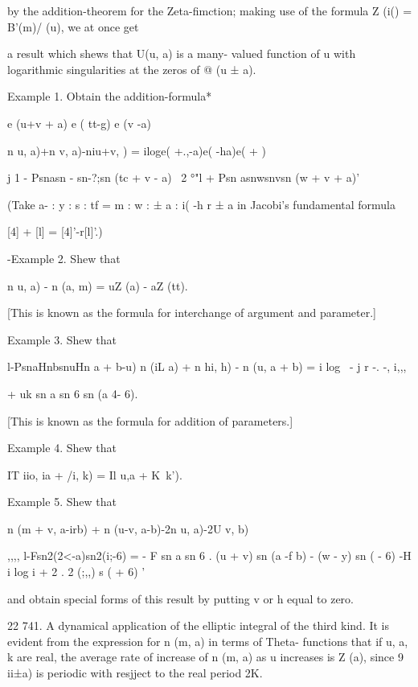 %
%

by the addition-theorem for the Zeta-fimction; making use of the
formula Z (i() = B'(m)/ (u), we at once get

a result which shews that U(u, a) is a many- valued function of u with
logarithmic singularities at the zeros of @ (u ± a).

Example 1. Obtain the addition-formula*

e (u+v + a) e ( tt-g) e (v -a)

n u, a)+n v, a)-niu+v, ) = iloge( +.,-a)e( -ha)e( + )

j 1 - Psnasn - sn-?;sn (tc + v - a) ~2 °"l + Psn asnwsnvsn (w + v +
a)'


(Take a- : y : s : tf = m : w : ± a : i( -h r ± a in Jacobi's
fundamental formula

[4] + [l] = [4]'-r[l]'.)

-Example 2. Shew that

n u, a) - n (a, m) = uZ (a) - aZ (tt).


[This is known as the formula for interchange of argument and
parameter.]

Example 3. Shew that

l-PsnaHnbsnuHn a + b-u) n (iL a) + n hi, h) - n (u, a + b) = i log \,
- j r -. -, i,,,\

+ uk sn a sn 6 sn (a 4- 6).

 [This is known as the formula for addition of parameters.]

Example 4. Shew that

IT iio, ia + /i, k) = Il u,a + K\ k'). 

Example 5. Shew that

n (m + v, a-irb) + n (u-v, a-b)-2n u, a)-2U v, b)

,,,, l-Fsn2(2<-a)sn2(i;-6) = - F sn a sn 6 . (u + v) sn (a -f b) -
(w - y) sn ( - 6) -H i log i + 2 . 2 (;,,) s ( + 6) '

and obtain special forms of this result by putting v or h equal to
zero. 

22 741. A dynamical application of the elliptic integral of the third
kind. It is evident from the expression for n (m, a) in terms of
Theta- functions that if u, a, k are real, the average rate of
increase of n (m, a) as u increases is Z (a), since 9 ii±a) is
periodic with resjject to the real period 2K.

